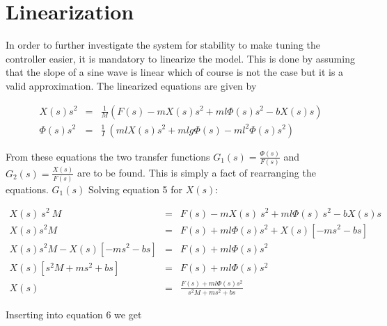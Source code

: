 \section{Linearization}
In order to further investigate the system for stability to make tuning the controller easier, it is mandatory to linearize the model. This is done by assuming that the slope of a sine wave is linear which of course is not the case but it is a valid approximation. The linearized equations are given by

	\begin{eqnarray}
		X\left(s\right)s^2&=&\frac{1}{M}\left(F\left(s\right)-mX\left(s\right)s^2+ml\Phi\left(s\right)s^2-bX\left(s\right)s\right)\\
		\Phi\left(s\right)s^2&=&\frac{1}{I}\ \left(mlX\left(s\right)s^2+mlg\Phi\left(s\right)-ml^2\Phi\left(s\right)s^2\right)
	\end{eqnarray}

From these equations the two transfer functions $G_1\left(s\right)=\frac{\Phi\left(s\right)}{F\left(s\right)}$ and $G_2\left(s\right)=\frac{X\left(s\right)}{F\left(s\right)}$ are to be found. This is simply a fact of rearranging the equations. \textbf{$G_1(s)$}
Solving equation 5 for $X(s)$:

\begin{eqnarray}
	X(s)\ s^2\ M&=&F(s)-mX(s)\ s^2+ml\Phi(s)\ s^2-bX(s)s \\
	X\left(s\right)s^2M&=&F\left(s\right)+ml\Phi\left(s\right)s^2+X\left(s\right)\left[-ms^2-bs\right] \\
	X\left(s\right)s^2M-X\left(s\right)\left[-ms^2-bs\right]&=&F\left(s\right)+ml\Phi\left(s\right)s^2 \\
	X\left(s\right)\left[s^2M+ms^2+bs\right]&=&F\left(s\right)+ml\Phi\left(s\right)s^2\\
	X\left(s\right)&=&\frac{F\left(s\right)+ml\Phi\left(s\right)s^2}{s^2M+ms^2+bs}
\end{eqnarray}

Inserting into equation 6 we get


